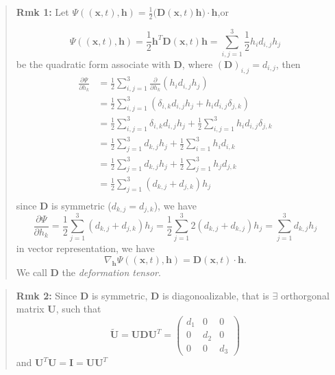 \begin{quote}
	\textbf{Rmk 1:}
Let $\displaystyle \Psi((\textbf{x},t),\textbf{h})=\frac{1}{2}\big(\textbf{D}(\textbf{x},t)\textbf{h}\big)\cdot\textbf{h}$,or

\begin{equation}
\Psi((\textbf{x},t),\textbf{h}) = \frac{1}{2}\textbf{h}^{T}\textbf{D}(\textbf{x},t)\textbf{h}
= \sum_{i,j=1}^{3}\frac{1}{2}h_{i}d_{i,j}h_{j}
\end{equation}
be the quadratic form associate with $\textbf{D}$, where $(\textbf{D})_{i,j} = d_{i,j}$, then
\begin{equation}
\begin{aligned}
\frac{\partial \Psi}{\partial h_{k}}
&= \frac{1}{2}\sum_{i,j=1}^{3}\frac{\partial}{\partial h_{k}}\left(h_{i}d_{i,j}h_{j}\right)\\
&= \frac{1}{2}\sum_{i,j=1}^{3}\left(\delta_{i,k}d_{i,j}h_{j} + h_{i}d_{i,j}\delta_{j,k}\right)\\
&= \frac{1}{2}\sum_{i,j=1}^{3}\delta_{i,k}d_{i,j}h_{j}
+ \frac{1}{2}\sum_{i,j=1}^{3} h_{i}d_{i,j}\delta_{j,k}\\
&= \frac{1}{2}\sum_{j=1}^{3}d_{k,j}h_{j}
+ \frac{1}{2}\sum_{i=1}^{3} h_{i}d_{i,k}\\
&= \frac{1}{2}\sum_{j=1}^{3}d_{k,j}h_{j}
+ \frac{1}{2}\sum_{j=1}^{3} h_{j}d_{j,k}\\
&= \frac{1}{2}\sum_{j=1}^{3}(d_{k,j} +  d_{j,k})h_{j}\\
\end{aligned}
\end{equation}
since $\textbf{D}$ is symmetric ($d_{k,j}=d_{j,k}$), we have
\begin{equation}
\frac{\partial \Psi}{\partial h_{k}}
= \frac{1}{2}\sum_{j=1}^{3}(d_{k,j} + d_{j,k})h_{j}
= \frac{1}{2}\sum_{j=1}^{3}2(d_{k,j} + d_{k,j})h_{j}
= \sum_{j=1}^{3}d_{k,j}h_{j}
\end{equation}
in vector representation, we have
\begin{equation}
\nabla_{\textbf{h}} \Psi((\textbf{x},t), \textbf{h}) = \textbf{D}(\textbf{x},t)\cdot \textbf{h}.
\end{equation}
We call $\textbf{D}$ the \textit{deformation tensor}.
\end{quote}

\begin{quote}
	\textbf{Rmk 2:}
Since $\textbf{D}$ is symmetric, $\textbf{D}$ is diagonoalizable, that is $\exists$ orthorgonal matrix $\textbf{U}$, such that
\begin{equation}
\widetilde{\textbf{U}} = \textbf{U}\textbf{D}\textbf{U}^{T}
= \begin{pmatrix}
d_1 & 0 & 0\\
0 & d_2 & 0\\
0 & 0 & d_3
\end{pmatrix}
\end{equation}
and $\textbf{U}^{T}\textbf{U} = \textbf{I} = \textbf{U}\textbf{U}^{T}$
\end{quote}

